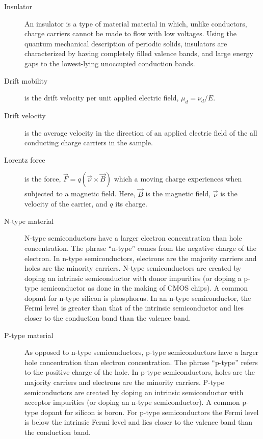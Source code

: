 \documentclass{../lab}
\begin{document}
\begin{description}
    \item[Insulator] An insulator is a type of material material in which, unlike conductors, charge carriers cannot be made to flow with low voltages. Using the quantum mechanical description of periodic solids, insulators are characterized by having completely filled valence bands, and large energy gaps to the lowest-lying unoccupied conduction bands.

    \item[Drift mobility] is the drift velocity per unit applied electric field, $\mu_d = \nu_d / E$.

    \item[Drift velocity] is the average velocity in the direction of an applied electric field of the all conducting charge carriers in the sample.

    \item[Lorentz force] is the force, $\vec{F} = q(\vec{\nu} \times \vec{B})$ which a moving charge experiences when subjected to a magnetic field. Here, $\vec{B}$ is the magnetic field, $\vec{\nu}$ is the velocity of the carrier, and $q$ its charge.

    \item[N-type material] N-type semiconductors have a larger electron concentration than hole concentration. The phrase ``n-type'' comes from the negative charge of the electron. In n-type semiconductors, electrons are the majority carriers and holes are the minority carriers. N-type semiconductors are created by doping an intrinsic semiconductor with donor impurities (or doping a p-type semiconductor as done in the making of CMOS chips). A common dopant for n-type silicon is phosphorus. In an n-type semiconductor, the Fermi level is greater than that of the intrinsic semiconductor and lies closer to the conduction band than the valence band.

    \item[P-type material] As opposed to n-type semiconductors, p-type semiconductors have a larger hole concentration than electron concentration. The phrase ``p-type'' refers to the positive charge of the hole. In p-type semiconductors, holes are the majority carriers and electrons are the minority carriers. P-type semiconductors are created by doping an intrinsic semiconductor with acceptor impurities (or doping an n-type semiconductor). A common p-type dopant for silicon is boron. For p-type semiconductors the Fermi level is below the intrinsic Fermi level and lies closer to the valence band than the conduction band.


\end{description}
\end{document}
